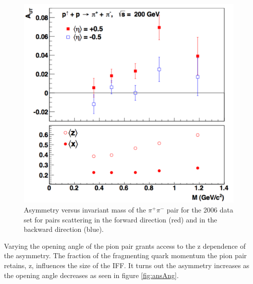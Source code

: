 \documentclass[abstract = on,listof=totoc, bibliography=totoc]{scrreprt}
\newcommand{\pip}{\pi^+}
\newcommand{\pim}{\pi^-}
\newcommand{\pair}{$\pip\pim$ }
\begin{document}
 \begin{figure}
\begin{center}
\includegraphics[width = 1\textwidth]{ansM_new}
\caption[$A_{UT}$ vs Invariant Mass in 2006 data set]{Asymmetry versus invariant mass of the \pair pair for the 2006 data set for pairs scattering in the forward direction (red) and in the backward direction (blue).}
\label{fig:ansM}
\end{center}
\end{figure}


Varying the opening angle of the pion pair grants access to the z dependence of the asymmetry. The fraction of the fragmenting quark momentum the pion pair retains, z, influences the size of the IFF. It turns out the asymmetry increases as the opening angle decreases as seen in figure \ref{fig:ansAng}.
\end{document}
